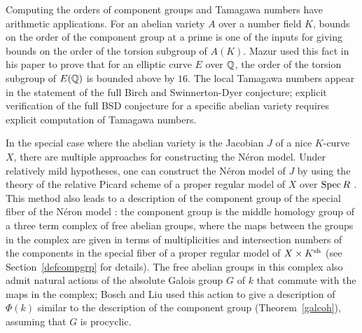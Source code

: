 Computing the orders of component groups and Tamagawa numbers have arithmetic applications. For an abelian variety $A$ over a number field $K$, bounds on the order of the component group at a prime is one of the inputs for giving bounds on the order of the torsion subgroup of $A(K)$. Mazur used this fact in his paper \cite{mazur} to prove that for an elliptic curve $E$ over $\mathbb Q$, the order of the torsion subgroup of $E(\mathbb Q)$ is bounded above by $16$. The local Tamagawa numbers appear in the statement of the full Birch and Swinnerton-Dyer conjecture; explicit verification of the full BSD conjecture for a specific abelian variety requires explicit computation of Tamagawa numbers. 

In the special case where the abelian variety is the Jacobian $J$ of a nice $K$-curve $X$, there are multiple approaches for constructing the N\'{e}ron model. Under relatively mild hypotheses, one can construct the N\'{e}ron model of $J$ by using the theory of the relative Picard scheme of a proper regular model of $X$ over $\operatorname{Spec} R$ \cite[Chapter~9, Section~5, Theorem~4]{blr}. This method also leads to a description of the component group of the special fiber of the N\'{e}ron model \cite[Chapter 9, Section 6, Theorem 1]{blr}: the component group is the middle homology group of a three term complex of free abelian groups, where the maps between the groups in the complex are given in terms of multiplicities and intersection numbers of the components in the special fiber of a proper regular model of $X \times K^{\textup{sh}}$ (see Section~\ref{defcompgrp} for details). The free abelian groups in this complex also admit natural actions of the absolute Galois group $G$ of $k$ that commute with the maps in the complex; Bosch and Liu used this action to give a description of $\Phi(k)$ similar to the description of the component group (Theorem~\ref{galcoh}), assuming that $G$ is procyclic.

